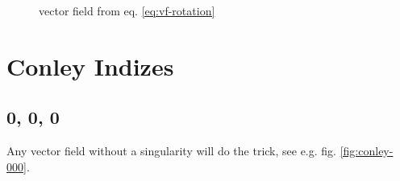 \documentclass[a4paper,10pt,notitlepage]{scrartcl}
\begin{document}
\begin{figure}[H]
  \centering
  \caption{vector field from eq. \ref{eq:vf-rotation}}
  \label{fig:vf-rotation}
\end{figure}

\section{Conley Indizes}

\subsection*{0, 0, 0}

Any vector field without a singularity will do the trick, see e.g. fig.
\ref{fig:conley-000}.
\end{document}
